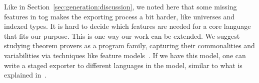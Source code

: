 Like in Section~\ref{sec:generation:discussion}, we noted here that some missing features in tog makes the exporting process a bit harder, like universes and indexed types. It is hard to decide which features are needed for a core language that fits our purpose. This is one way our work can be extended. We suggest studying theorem provers as a program family, capturing their commonalities and variabilities via techniques like feature models~\cite{czarnecki2000generative}. If we have this model, one can write a staged exporter to different languages in the model, similar to what is explained in~\cite{stagedConfig}. 


\begin{comment}
Our algorithms generate record definitions, inductive data types and functions. We study how those three constructs look like in Agda. 

\section{Record Definitions}
A record in Tog is has the type \lstmath{Decl} and is created using the \lstmath{Record} constructor as follows 
\begin{hscode}
Record Name Params RecordBody
\end{hscode}
The parameters are either empty or contains \lstmath{[Binding]}, as discussed in \ref{ch:tog}. \lstmath{RecordBody} contains information about the kind of the record, its constructor, and the fields it contains. A simplified view of the fields is \lstmath{[Constr]}. 

A record in Agda consists of 
\begin{itemize}
\item the keyword \lstmath{record}
\item the name of the type 
\item list of parameters surrounded by parenthesis  
\item A semicolon that seperates the name and params from the type 
\item the keyword \lstmath{where}
\item 
\end{itemize}
\end{comment}


